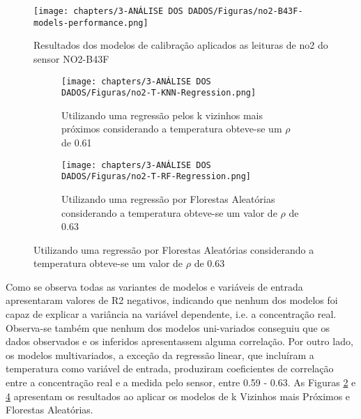 \begin{figure}[h!]
    \centering
    \caption{Resultados dos modelos de calibração aplicados as leituras de \acrshort{no2} do sensor NO2-B43F}
    \texttt{[image: chapters/3-ANÁLISE DOS DADOS/Figuras/no2-B43F-models-performance.png]}
    \label{fig:data-no2-models-performance}
\end{figure}

\begin{figure}[h!]
    \centering
    \caption{Gráfico de dispersão das leituras do sensor de \acrshort{no2} NO2-B43F e a estação de referência após aplicar modelos de regressão considerando a temperatura}
    \begin{subfigure}{0.49\textwidth}
        \texttt{[image: chapters/3-ANÁLISE DOS DADOS/Figuras/no2-T-KNN-Regression.png]}
        \caption{Utilizando uma regressão pelos k vizinhos mais próximos considerando a temperatura obteve-se um $\rho$ de 0.61}
        \label{fig:data-no2-T-reference-corr-KNN}
    \end{subfigure}
    \hfill
    \begin{subfigure}{0.49\textwidth}
        \texttt{[image: chapters/3-ANÁLISE DOS DADOS/Figuras/no2-T-RF-Regression.png]}
        \caption{Utilizando uma regressão por Florestas Aleatórias considerando a temperatura obteve-se um valor de $\rho$ de 0.63}
        \label{fig:data-no2-T-reference-corr-RF}
    \end{subfigure}
\end{figure}

Como se observa todas as variantes de modelos e variáveis de entrada apresentaram valores de R2 negativos, indicando que nenhum dos modelos foi capaz de explicar a variância na variável dependente, i.e. a concentração real. Observa-se também que nenhum dos modelos uni-variados conseguiu que os dados observados e os inferidos apresentassem alguma correlação. Por outro lado, os modelos multivariados, a exceção da regressão linear, que incluíram a temperatura como variável de entrada, produziram coeficientes de correlação entre a concentração real e a medida pelo sensor, entre 0.59 - 0.63. As Figuras \ref{fig:data-no2-T-reference-corr-KNN} e \ref{fig:data-no2-T-reference-corr-RF} apresentam os resultados ao aplicar os modelos de k Vizinhos mais Próximos e Florestas Aleatórias.
